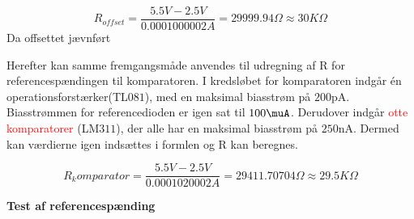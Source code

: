 \begin{equation}
R_{offset}=\frac{5.5V-2.5V}{0.0001000002A}=29999.94\Omega \approx 30K\Omega
\end{equation}  
Da offsettet jævnført 

Herefter kan samme fremgangsmåde anvendes til udregning af R for referencespændingen til komparatoren. I kredsløbet for komparatoren indgår én operationsforstærker(TL$081$), med en maksimal biasstrøm på $200$pA. Biasstrømmen for referencedioden er igen sat til $100\muA$. Derudover indgår \textcolor{red}{otte komparatorer} (LM$311$), der alle har en maksimal biasstrøm på $250$nA. Dermed kan værdierne igen indsættes i formlen og R kan beregnes.

\begin{equation}
R_komparator=\frac{5.5V-2.5V}{0.0001020002A}=29411.70704\Omega \approx 29.5K\Omega 
\end{equation} 

\textbf{Test af referencespænding}


 